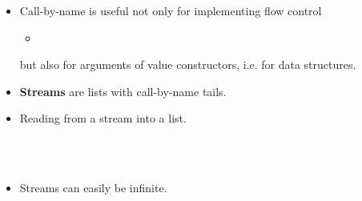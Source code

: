 \documentclass{beamer}
\newcommand{\tmstrong}[1]{\textbf{#1}}
\begin{document}
\begin{itemize}
  \item Call-by-name is useful not only for implementing flow control
  \begin{itemize}
    \item {}{}{\hlopt{=}}{\hlendline{}}\\
    {\hlstd{ \ }}{}{}{}{\hlopt{->
    }}{}{\hlopt{() \textbar }}{}{\hlopt{->
    }}{}{\hlopt{()}}{\hlendline{}}
  \end{itemize}
  but also for arguments of value constructors, i.e. for data structures.
  
  \item {\tmstrong{Streams}} are lists with call-by-name tails.
  
  {}{}{\hlopt{= }}{}{\hlopt{\textbar }}{}{}{}{\hlopt{*
  (}}{}{\hlopt{-> }}{}{\hlopt{)}}
  
  \item Reading from a stream into a list.
  
  {}{}{\hlopt{=
  }}{}{\hlendline{}}\\
  {\hlstd{ {\hlopt{\textbar}} }}{}{\hlopt{(}}{}{\hlopt{, }}{}{\hlopt{) }}{}{}{\hlopt{> }}{}{\hlopt{->
  }}{}{\hlopt{::(}}{}{\hlopt{(}}{}{\hlopt{-}}{}{\hlopt{) (}}{}{\hlopt{()))}}{\hlendline{}}\\
  {\hlstd{ {\hlopt{\textbar}} {\textunderscore} }}{\hlopt{->
  []}}{\hlendline{}}
  
  \item Streams can easily be infinite.
  
  {}{}{\hlopt{= }}{}{\hlopt{(}}{}{\hlopt{, }}{}{\hlopt{() ->
  }}{}{\hlopt{)}}{\hlendline{}}\\
  {}{}{\hlopt{=}}{\hlendline{}}\\
  {\hlstd{ \ }}{}{\hlopt{(}}{}{\hlopt{, }}{}{\hlopt{() ->}}{}{\hlopt{
  (}}{}{\hlopt{+}}{}{\hlopt{))}}{\hlendline{}}
  

\end{itemize}
\end{document}
